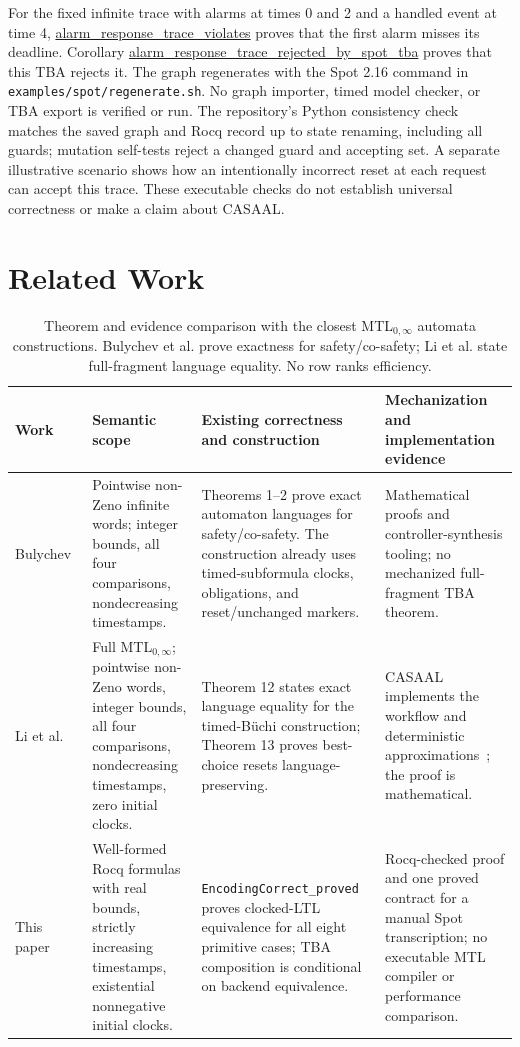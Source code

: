 \documentclass[10pt,journal,compsoc]{IEEEtran}
\newcommand{\Rocqid}[1]{{\small\url{#1}}}
\begin{document}
For the fixed infinite trace with alarms at times 0 and 2 and a handled event
at time 4, \Rocqid{alarm_response_trace_violates} proves that the first
alarm misses its deadline. Corollary
\Rocqid{alarm_response_trace_rejected_by_spot_tba} proves that this
TBA rejects it. The graph regenerates with the Spot 2.16 command in
\texttt{examples/spot/regenerate.sh}. No graph importer, timed model checker,
or TBA export is verified or run. The repository's Python consistency check
matches the saved graph and Rocq record up to state renaming, including all
guards; mutation self-tests reject a changed guard and accepting set. A
separate illustrative scenario shows how an intentionally incorrect reset at
each request can accept this trace. These executable checks do not establish
universal correctness or make a claim about CASAAL.

\section{Related Work}
\label{sec:related}
\begin{table}[!t]
\centering
\caption{Theorem and evidence comparison with the closest MTL$_{0,\infty}$
automata constructions. Bulychev et al. prove exactness for safety/co-safety;
Li et al. state full-fragment language equality. No row ranks efficiency.}
\label{tab:prior-construction-comparison}
\small
\setlength{\tabcolsep}{3pt}
\begin{tabular}{@{}p{}p{}p{}p{}@{}}
\toprule
Work & Semantic scope & Existing correctness and construction & Mechanization and implementation evidence\\
\midrule
Bulychev~\cite{[BDLG14]} & Pointwise non-Zeno infinite words; integer bounds, all four comparisons, nondecreasing timestamps. & Theorems 1--2 prove exact automaton languages for safety/co-safety. The construction already uses timed-subformula clocks, obligations, and reset/unchanged markers. & Mathematical proofs and controller-synthesis tooling; no mechanized full-fragment TBA theorem.\\
Li et al.~\cite{li_spin7} & Full MTL$_{0,\infty}$; pointwise non-Zeno words, integer bounds, all four comparisons, nondecreasing timestamps, zero initial clocks. & Theorem 12 states exact language equality for the timed-B\"uchi construction; Theorem 13 proves best-choice resets language-preserving. & CASAAL implements the workflow and deterministic approximations~\cite{casaal_tool}; the proof is mathematical.\\
This paper & Well-formed Rocq formulas with real bounds, strictly increasing timestamps, existential nonnegative initial clocks. & \texttt{EncodingCorrect\_proved} proves clocked-LTL equivalence for all eight primitive cases; TBA composition is conditional on backend equivalence. & Rocq-checked proof and one proved contract for a manual Spot transcription; no executable MTL compiler or performance comparison.\\
\bottomrule
\end{tabular}
\end{table}
\end{document}
